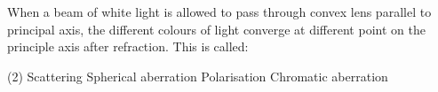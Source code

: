 \item When a beam of white light is allowed to pass through convex lens parallel to principal axis, the different colours of light converge at different point on the principle axis after refraction. This is called:
    \begin{tasks}(2)
        \task Scattering
        \task Spherical aberration
        \task Polarisation
        \task Chromatic aberration
    \end{tasks}